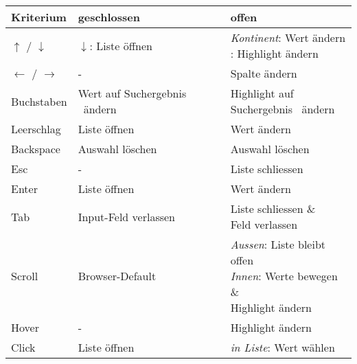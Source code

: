 \begin{table}[!htb]
    \label{table:interactionCountryInput}
    \footnotesize
    \begin{adjustbox}{max width=\textwidth}
        \begin{threeparttable}
            \begin{tabular}{ l || l | l }
                \bf{Kriterium}    & \bf{geschlossen} & \bf{offen} \\
                \hline \hline
                $\uparrow$ / $\downarrow$     & \emph{$\downarrow$}: Liste öffnen & \tbbr{\emph{Kontinent}: Wert ändern \\ {Land}: Highlight ändern } \\
                \hline
                $\leftarrow$ / $\rightarrow$  & -                                 & Spalte ändern \\
                \hline
                Buchstaben  & Wert auf Suchergebnis\tnote{1} \ ändern & \tbbr{Highlight auf \\ Suchergebnis\tnote{1} \ ändern} \\
                \hline
                Leerschlag  & Liste öffnen    & Wert ändern       \\
                \hline
                Backspace   & Auswahl löschen & Auswahl löschen   \\
                \hline
                Esc         & -               & Liste schliessen  \\
                \hline \hline
                Enter       & Liste öffnen    & Wert ändern       \\
                \hline
                Tab         & Input-Feld verlassen            & \tbbr{Liste schliessen \& \\ Feld verlassen } \\
                \hline \hline
                Scroll     & Browser-Default\tnote{2}         & \tbbr{\emph{Aussen}: Liste bleibt offen \\
                                                                    \emph{Innen}: Werte bewegen \& \\ Highlight ändern} \\
                \hline
                Hover      & -                & Highlight ändern \\
                \hline
                Click      & Liste öffnen     & \tbbr{\emph{in Liste}: Wert wählen \\
}
\end{tabular}
\end{threeparttable}
\end{adjustbox}
\end{table}
